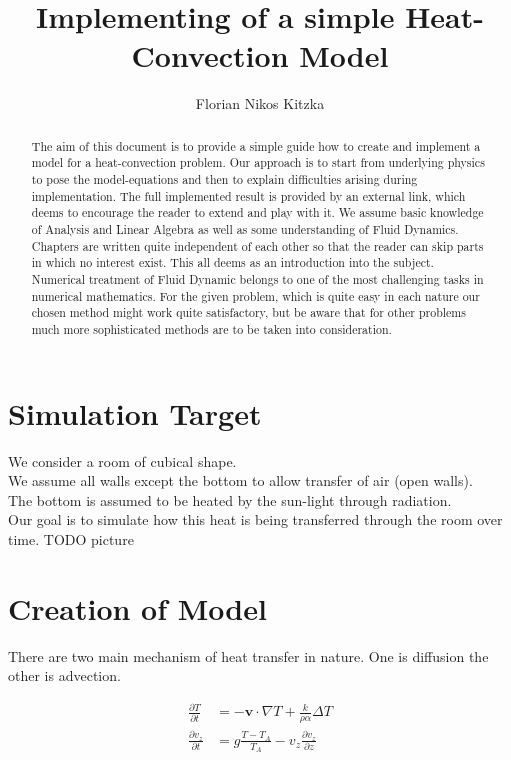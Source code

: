 \documentclass[]{article}
\title{Implementing of a simple Heat-Convection Model}
\author{Florian Nikos Kitzka}
\begin{document}
\maketitle

\begin{abstract}
The aim of this document is to provide a simple guide how to create and implement a model for a heat-convection problem. Our approach is to start from underlying physics to pose the model-equations and then to explain difficulties arising during implementation.
The full implemented result is provided by an external link, which deems to encourage the reader to extend and play with it.
We assume basic knowledge of Analysis and Linear Algebra as well as some understanding of 
Fluid Dynamics. Chapters are written quite independent of each other so that the reader
can skip parts in which no interest exist.
This all deems as an introduction into the subject. Numerical treatment of Fluid Dynamic belongs to one of the most challenging tasks in numerical mathematics.
For the given problem, which is quite easy in each nature our chosen method might work quite satisfactory, but be aware that for other problems much more sophisticated methods are to be taken into consideration.
\end{abstract}

\tableofcontents

\section{Simulation Target}
We consider a room of cubical shape.\\
We assume all walls except the bottom to allow transfer of air (open walls).\\
The bottom is assumed to be heated by the sun-light through radiation.\\
Our goal is to simulate how this heat is being transferred through the room over time.
TODO picture

\section{Creation of Model} \label{model_creation}
There are two main mechanism of heat transfer in nature. One is diffusion the other is advection.


\begin{align} 
\frac{\partial T}{\partial t}&=-\textbf{v}\cdot \nabla T + \frac{k}{\rho\alpha}\Delta T \label{model_equations} \\
\frac{\partial v_{z}}{\partial t}&=g\frac{T-T_{A}}{T_{A}}-v_{z}\frac{\partial v_{z}}{\partial z} \nonumber
\end{align}
\end{document}
